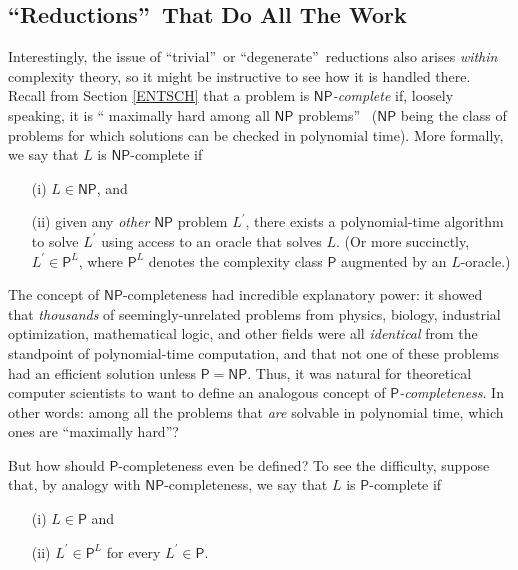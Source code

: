 \documentclass[12pt,onecolumn]{article}%
\begin{document}
\subsection{\textquotedblleft Reductions\textquotedblright\  That Do All The
Work\label{REDUCTIONS}}

Interestingly, the issue of \textquotedblleft trivial\textquotedblright\  or
\textquotedblleft degenerate\textquotedblright\  reductions also arises
\textit{within} complexity theory, so it might be instructive to see how it is
handled there. Recall from Section \ref{ENTSCH} that a problem is
$\mathsf{NP}$\textit{-complete} if, loosely speaking, it is \textquotedblleft
maximally hard among all $\mathsf{NP}$ problems\textquotedblright\ %
 ($\mathsf{NP}$ being the class of problems for which solutions can be
checked in polynomial time). More formally, we say that $L$ is $\mathsf{NP}$-complete if

\begin{enumerate}
\item[(i)] $L\in\mathsf{NP}$, and

\item[(ii)] given any \textit{other} $\mathsf{NP}$ problem $L^{\prime}$,
there exists a polynomial-time algorithm to solve $L^{\prime}$ using access to
an oracle that solves $L$. (Or more succinctly, $L^{\prime}\in\mathsf{P}%
^{L}$, where $\mathsf{P}^{L}$ denotes the complexity class $\mathsf{P}%
$ augmented by an $L$-oracle.)
\end{enumerate}

The concept of $\mathsf{NP}$-completeness had incredible explanatory power: it
showed that \textit{thousands} of seemingly-unrelated problems from physics,
biology, industrial optimization, mathematical logic, and other fields were
all \textit{identical} from the standpoint of polynomial-time computation, and
that not one of these problems had an efficient solution unless $\mathsf{P}%
=\mathsf{NP}$. Thus, it was natural for theoretical computer scientists to
want to define an analogous concept of $\mathsf{P}$\textit{-completeness}.
 In other words: among all the problems that \textit{are} solvable in
polynomial time, which ones are \textquotedblleft maximally
hard\textquotedblright ?

But how should $\mathsf{P}$-completeness even be defined? To see the
difficulty, suppose that, by analogy with $\mathsf{NP}$-completeness, we say
that $L$ is $\mathsf{P}$-complete if

\begin{enumerate}
\item[(i)] $L\in\mathsf{P}$ and

\item[(ii)] $L^{\prime}\in\mathsf{P}^{L}$ for every $L^{\prime}\in\mathsf{P}$.
\end{enumerate}
\end{document}
